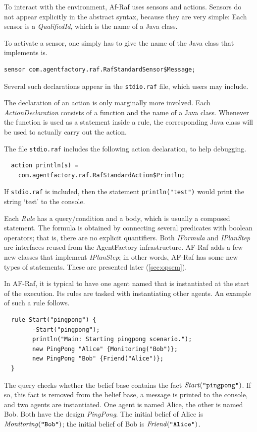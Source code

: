 \documentclass[a4paper,12pt,oneside,fleqn]{book} %
\begin{document}
To interact with the environment, Af-Raf uses sensors and actions.
Sensors do not appear explicitly in the abstract syntax, because they
are very simple: Each sensor is a {\it QualifiedId}, which is the name of a
Java class.

\begin{example}
To activate a sensor, one simply has to give the name of the Java class
that implements is.
\begin{verbatim}
sensor com.agentfactory.raf.RafStandardSensor$Message;
\end{verbatim}
Several such declarations appear in the {\tt stdio.raf} file, which users
may include.
\end{example}

The declaration of an action is only marginally more involved.  Each
{\it ActionDeclaration\/} consists of a function and the name of a Java
class. Whenever the function is used as a statement inside a rule, the
corresponding Java class will be used to actually carry out the action.

\begin{example}
The file {\tt stdio.raf} includes the following action declaration, to help
debugging.
\begin{verbatim}
  action println(s) =
    com.agentfactory.raf.RafStandardAction$Println;
\end{verbatim}
If {\tt stdio.raf} is included, then the statement {\tt println("test")}
would print the string `test' to the console.
\end{example}

Each {\it Rule\/} has a query\slash condition and a body, which is usually
a composed statement. The formula is obtained by connecting several
predicates with boolean operators; that is, there are no explicit
quantifiers. Both {\it IFormula\/} and {\it IPlanStep\/} are interfaces
reused from the AgentFactory infrastructure. AF-Raf adds a few new classes
that implement {\it IPlanStep\/}; in other words, AF-Raf has some new
types of statements. These are presented later (\autoref{sec:opsem}).

\begin{example}
In AF-Raf, it is typical to have one agent named that is instantiated at
the start of the execution. Its rules are tasked with instantiating other
agents. An example of such a rule follows.
\begin{verbatim}
  rule Start("pingpong") {
        -Start("pingpong");
        println("Main: Starting pingpong scenario.");
        new PingPong "Alice" {Monitoring("Bob")};
        new PingPong "Bob" {Friend("Alice")};
  }
\end{verbatim}
The query checks whether the belief base contains the fact ${\it
Start}(\text{\tt``pingpong''})$. If so, this fact is removed from the
belief base, a message is printed to the console, and two agents are
instantiated. One agent is named Alice, the other is named Bob. Both have
the design {\it PingPong}. The initial belief of Alice is ${\it
Monitoring}(\text{\tt ``Bob''})$; the initial belief of Bob is ${\it
Friend}(\text{\tt``Alice''})$.
\end{example}
\end{document}
